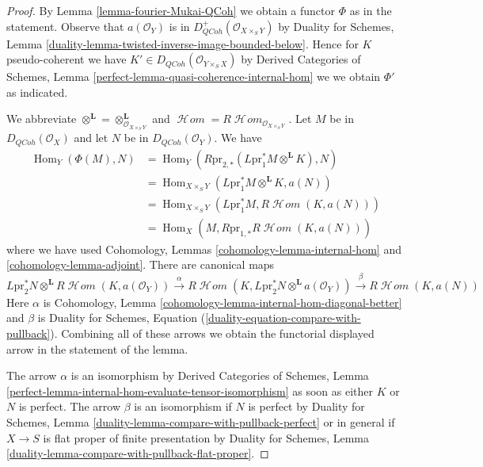 \documentclass{stacks-project}
\theoremstyle{plain}
\theoremstyle{definition}
\theoremstyle{remark}
\numberwithin{equation}{subsection}
\def\Hom{\mathop{\mathrm{Hom}}\nolimits}
\def\SheafHom{\mathop{\mathcal{H}\!\mathit{om}}\nolimits}
\def\QCoh{\mathit{QCoh}}
\begin{document}
\begin{proof}
By Lemma \ref{lemma-fourier-Mukai-QCoh} we obtain a functor $\Phi$
as in the statement. Observe that $a(\mathcal{O}_Y)$ is in
$D^+_\QCoh(\mathcal{O}_{X \times_S Y})$ by Duality for Schemes,
Lemma \ref{duality-lemma-twisted-inverse-image-bounded-below}.
Hence for $K$ pseudo-coherent we have
$K' \in D_\QCoh(\mathcal{O}_{Y \times_S X})$
by Derived Categories of Schemes, Lemma
\ref{perfect-lemma-quasi-coherence-internal-hom}
we we obtain $\Phi'$ as indicated.

\medskip\noindent
We abbreviate
$\otimes^\mathbf{L} = \otimes_{\mathcal{O}_{X \times_S Y}}^\mathbf{L}$
and
$\SheafHom = R\SheafHom_{\mathcal{O}_{X \times_S Y}}$.
Let $M$ be in $D_\QCoh(\mathcal{O}_X)$ and let
$N$ be in $D_\QCoh(\mathcal{O}_Y)$. We have
\begin{align*}
\Hom_Y(\Phi(M), N)
& =
\Hom_Y(R\text{pr}_{2, *}(L\text{pr}_1^*M \otimes^\mathbf{L} K), N) \\
& =
\Hom_{X \times_S Y}(L\text{pr}_1^*M \otimes^\mathbf{L} K, a(N)) \\
& =
\Hom_{X \times_S Y}(L\text{pr}_1^*M,
R\SheafHom(K, a(N))) \\
& =
\Hom_X(M, R\text{pr}_{1, *}R\SheafHom(K, a(N)))
\end{align*}
where we have used Cohomology, Lemmas \ref{cohomology-lemma-internal-hom}
and \ref{cohomology-lemma-adjoint}. There are canonical maps
$$
L\text{pr}_2^*N \otimes^\mathbf{L} R\SheafHom(K, a(\mathcal{O}_Y))
\xrightarrow{\alpha}
R\SheafHom(K, L\text{pr}_2^*N \otimes^\mathbf{L} a(\mathcal{O}_Y))
\xrightarrow{\beta}
R\SheafHom(K, a(N))
$$
Here $\alpha$ is
Cohomology, Lemma \ref{cohomology-lemma-internal-hom-diagonal-better}
and $\beta$ is Duality for Schemes, Equation
(\ref{duality-equation-compare-with-pullback}).
Combining all of these arrows we obtain the functorial displayed
arrow in the statement of the lemma.

\medskip\noindent
The arrow $\alpha$ is an isomorphism by
Derived Categories of Schemes, Lemma
\ref{perfect-lemma-internal-hom-evaluate-tensor-isomorphism}
as soon as either $K$ or $N$ is perfect.
The arrow $\beta$ is an isomorphism if $N$ is perfect by
Duality for Schemes, Lemma \ref{duality-lemma-compare-with-pullback-perfect}
or in general if $X \to S$ is
flat proper of finite presentation by
Duality for Schemes, Lemma
\ref{duality-lemma-compare-with-pullback-flat-proper}.
\end{proof}
\end{document}
